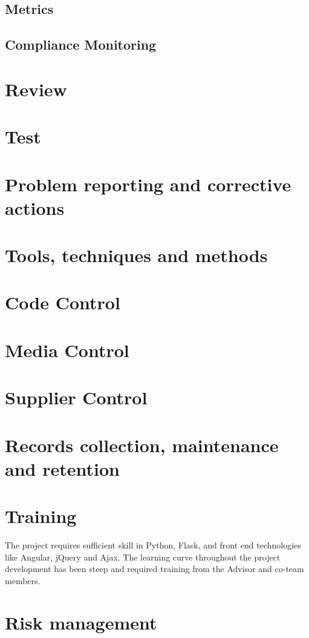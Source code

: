 \documentclass[12pt,letterpaper, margin=1in]{article}
\begin{document}
\subsection{Metrics}

\subsection{Compliance Monitoring}

\section{Review}

\section{Test}

\section{Problem reporting and corrective actions}
\section{Tools, techniques and methods}
\section{Code Control}
\section{Media Control}
\section{Supplier Control}
\section{Records collection, maintenance and retention}

\section{Training}
The project requires sufficient skill in Python, Flask, and front end technologies like Angular, jQuery and Ajax. The learning curve throughout the project development has been steep and required training from the Advisor and co-team members. 

\section{Risk management}
\end{document}
